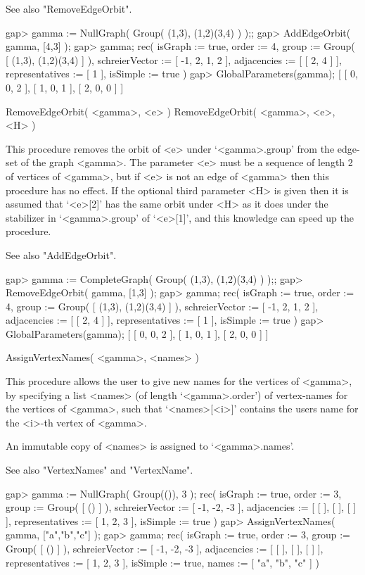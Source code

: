 See also "RemoveEdgeOrbit".

\beginexample
gap> gamma := NullGraph( Group( (1,3), (1,2)(3,4) ) );;
gap> AddEdgeOrbit( gamma, [4,3] );
gap> gamma;
rec(
  isGraph := true,
  order := 4,
  group := Group( [ (1,3), (1,2)(3,4) ] ),
  schreierVector := [ -1, 2, 1, 2 ],
  adjacencies := [ [ 2, 4 ] ],
  representatives := [ 1 ],
  isSimple := true )
gap> GlobalParameters(gamma);
[ [ 0, 0, 2 ], [ 1, 0, 1 ], [ 2, 0, 0 ] ]
\endexample


\>RemoveEdgeOrbit( <gamma>, <e> )
\>RemoveEdgeOrbit( <gamma>, <e>, <H> )

This procedure removes the orbit of <e> under `<gamma>.group' from the
edge-set of the graph <gamma>. The parameter <e> must be a sequence of
length 2 of vertices of <gamma>, but if <e> is not an edge of <gamma>
then this procedure has no effect. If the optional third parameter <H>
is given then it is assumed that `<e>[2]' has the same orbit under <H>
as it does under the stabilizer in `<gamma>.group' of `<e>[1]', and
this knowledge can speed up the procedure.

See also "AddEdgeOrbit".

\beginexample
gap> gamma := CompleteGraph( Group( (1,3), (1,2)(3,4) ) );;
gap> RemoveEdgeOrbit( gamma, [1,3] );
gap> gamma;
rec(
  isGraph := true,
  order := 4,
  group := Group( [ (1,3), (1,2)(3,4) ] ),
  schreierVector := [ -1, 2, 1, 2 ],
  adjacencies := [ [ 2, 4 ] ],
  representatives := [ 1 ],
  isSimple := true )
gap> GlobalParameters(gamma);
[ [ 0, 0, 2 ], [ 1, 0, 1 ], [ 2, 0, 0 ] ]
\endexample


\>AssignVertexNames( <gamma>, <names> )

This procedure allows the user to give new names for the vertices of
<gamma>, by specifying a list <names> (of length `<gamma>.order') of
vertex-names for the vertices of <gamma>, such that `<names>[<i>]'
contains the user{\pif}s name for the <i>-th vertex of <gamma>.

An immutable copy of <names> is assigned to `<gamma>.names'. 

See also "VertexNames" and "VertexName".

\beginexample
gap> gamma := NullGraph( Group(()), 3 );
rec(
  isGraph := true,
  order := 3,
  group := Group( [ () ] ),
  schreierVector := [ -1, -2, -3 ],
  adjacencies := [ [  ], [  ], [  ] ],
  representatives := [ 1, 2, 3 ],
  isSimple := true )
gap> AssignVertexNames( gamma, ["a","b","c"] );
gap> gamma;
rec(
  isGraph := true,
  order := 3,
  group := Group( [ () ] ),
  schreierVector := [ -1, -2, -3 ],
  adjacencies := [ [  ], [  ], [  ] ],
  representatives := [ 1, 2, 3 ],
  isSimple := true,
  names := [ "a", "b", "c" ] )
\endexample
